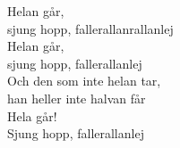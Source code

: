 \vspace{10pt}
Helan går,\\
sjung hopp, fallerallanrallanlej\\
Helan går,\\
sjung hopp, fallerallanlej\\
Och den som inte helan tar,\\
han heller inte halvan får\\
Hela går! \\
Sjung hopp, fallerallanlej
